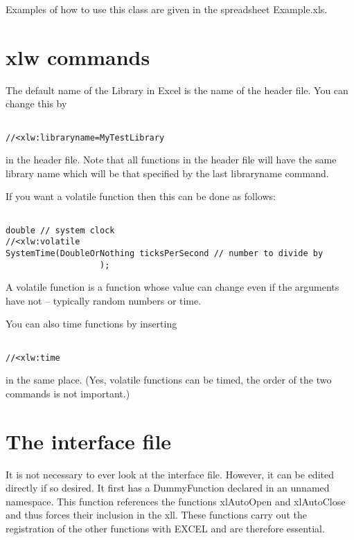 \documentclass[12pt,reqno]{amsart}
\numberwithin{equation}{section}
\numberwithin{figure}{section}
\begin{document}
Examples of how to use this class are given in the spreadsheet
Example.xls.

\section{xlw commands}

The default name of the Library in Excel is the name of the header
file. You can change this by

\begin{verbatim}

//<xlw:libraryname=MyTestLibrary

\end{verbatim}

in the header file. Note that all functions in the header file will have
the same library name which will be that specified by the last
libraryname command. 

If you want a volatile function then this can be done as follows:

\begin{verbatim}

double // system clock
//<xlw:volatile    
SystemTime(DoubleOrNothing ticksPerSecond // number to divide by
                   );

\end{verbatim}

A volatile function is a function whose value can change even if the
arguments have not -- typically random numbers or time. 

You can also time functions by inserting 
\begin{verbatim}

//<xlw:time

\end{verbatim}
in the same place. (Yes, volatile functions can be timed, the order of
the two commands is not important.)


\section{The interface file}

It is not necessary to ever look at the interface file. However, it
can be edited directly if so desired. It first has a DummyFunction
declared in an unnamed namespace. This function references the
functions xlAutoOpen and xlAutoClose and thus forces their inclusion
in the xll. These functions carry out the registration of the other
functions with EXCEL and are therefore essential. 
\end{document}
